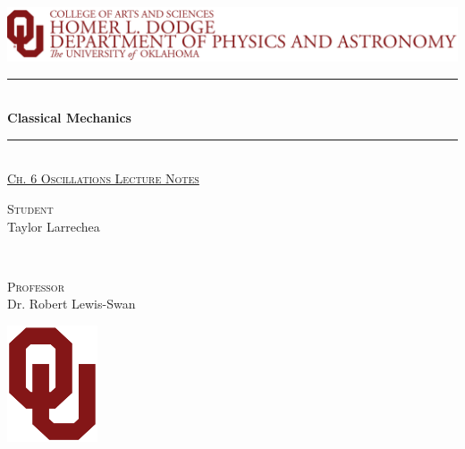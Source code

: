 \documentclass{article}
\begin{document}
\begin{titlepage} 
\newcommand{\HRule}{\rule{\linewidth}{0.5mm}}
\center %
\includegraphics[width=1.0\textwidth]{OU Physics.png}\\[1cm]
\HRule\\[0.2cm]
{\huge\bfseries Classical Mechanics}\\[0.0cm] %
\HRule\\[0.25cm]
\textsc{\large \underline{Ch. 6 Oscillations Lecture Notes}}\\[0.5cm] %
\vspace{50pt}
\begin{minipage}{0.4\textwidth}
	\begin{flushleft}
		\large
		\textsc{Student}\\
		Taylor Larrechea %
	\end{flushleft}
\end{minipage}
	~
\begin{minipage}{0.4\textwidth}
	\begin{flushright}
		\large
		\textsc{Professor}\\
		Dr. Robert Lewis-Swan %
	\end{flushright}
\end{minipage}
\vfill\vfill\vfill %
\includegraphics[width=0.2\textwidth]{OU Logo.png}\\[1cm]
\vfill %
\end{titlepage}
\end{document}

